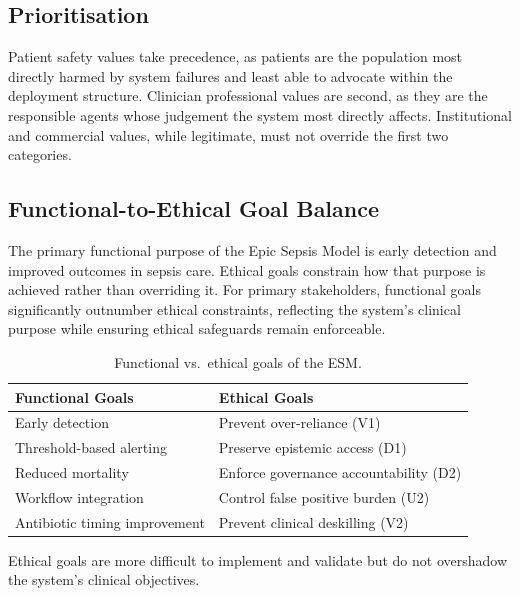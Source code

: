 \documentclass[]{UCD_CS_41820_Report}
\begin{document}
\subsection*{Prioritisation}

Patient safety values take precedence, as patients are the population most directly
harmed by system failures and least able to advocate within the deployment structure.
Clinician professional values are second, as they are the responsible agents whose
judgement the system most directly affects. Institutional and commercial values,
while legitimate, must not override the first two categories.

\subsection*{Functional-to-Ethical Goal Balance}

The primary functional purpose of the Epic Sepsis Model is early detection and
improved outcomes in sepsis care. Ethical goals constrain how that purpose is
achieved rather than overriding it. For primary stakeholders, functional goals
significantly outnumber ethical constraints, reflecting the system's clinical purpose
while ensuring ethical safeguards remain enforceable.

\begin{table}[H]
\centering
\renewcommand{\arraystretch}{1.3}
\begin{tabular}{@{}ll@{}}
\toprule
\textbf{Functional Goals} & \textbf{Ethical Goals} \\
\midrule
Early detection                      & Prevent over-reliance (V1) \\
Threshold-based alerting             & Preserve epistemic access (D1) \\
Reduced mortality                    & Enforce governance accountability (D2) \\
Workflow integration                 & Control false positive burden (U2) \\
Antibiotic timing improvement        & Prevent clinical deskilling (V2) \\
\bottomrule
\end{tabular}
\caption{Functional vs.\ ethical goals of the ESM.}
\label{tab:goal_balance}
\end{table}

Ethical goals are more difficult to implement and validate but do not overshadow
the system's clinical objectives.
\end{document}
